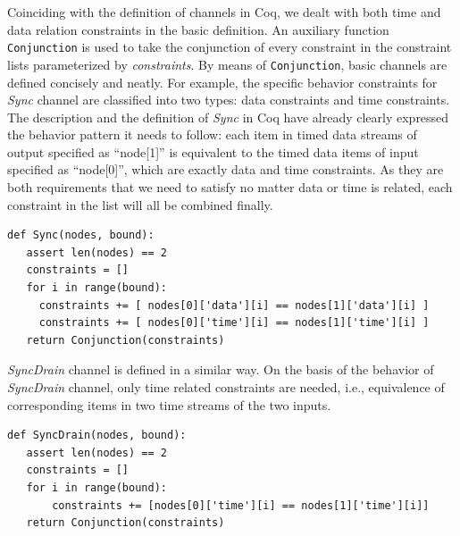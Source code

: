 \documentclass[preprint,3p]{elsarticle}
\begin{document}
Coinciding with the definition of channels in Coq, we dealt with both time and data relation constraints in the basic definition. An auxiliary function \texttt{Conjunction} is used to take the conjunction of every constraint in the constraint lists parameterized by \emph{constraints}.
By means of \texttt{Conjunction}, basic channels are defined concisely and neatly. For example, the specific behavior constraints for \emph{Sync} channel are classified into two types: data constraints and time constraints. The description and the definition of \emph{Sync} in Coq have already clearly expressed the behavior pattern it needs to follow: each item in timed data streams of output specified as ``node[1]'' is equivalent to the timed data items of input specified as ``node[0]'', which are exactly data and time constraints. As they are both requirements that we need to satisfy no matter data or time is related, each constraint in the list will all be combined finally.
\begin{lstlisting}
def Sync(nodes, bound):
   assert len(nodes) == 2
   constraints = []
   for i in range(bound):
     constraints += [ nodes[0]['data'][i] == nodes[1]['data'][i] ]
     constraints += [ nodes[0]['time'][i] == nodes[1]['time'][i] ]
   return Conjunction(constraints)
\end{lstlisting}

\emph{SyncDrain} channel is defined in a similar way. On the basis of the behavior of \emph{SyncDrain} channel, only time related constraints are needed, i.e., equivalence of corresponding items in two time streams of the two inputs.
\begin{lstlisting}
def SyncDrain(nodes, bound):
   assert len(nodes) == 2
   constraints = []
   for i in range(bound):
       constraints += [nodes[0]['time'][i] == nodes[1]['time'][i]]
   return Conjunction(constraints)
\end{lstlisting}
\end{document}
